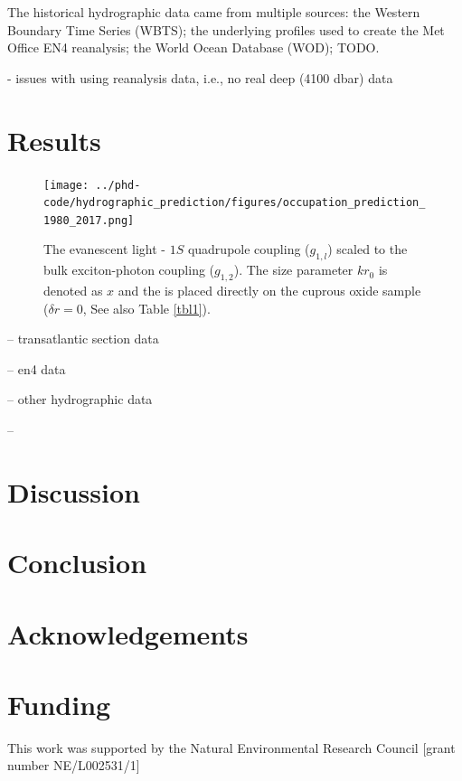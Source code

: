 \documentclass[a4paper,fleqn]{cas-sc}
\begin{document}
The historical hydrographic data came from multiple sources: the Western Boundary Time Series (WBTS); the underlying profiles used to create the Met Office EN4 reanalysis; the World Ocean Database (WOD); TODO.

- issues with using reanalysis data, i.e., no real deep (4100 dbar) data


\section{Results}

\begin{figure}
	\centering
		\texttt{[image: ../phd-code/hydrographic\_prediction/figures/occupation\_prediction\_1980\_2017.png]}
	\caption{The evanescent light - $1S$ quadrupole coupling
	($g_{1,l}$) scaled to the bulk exciton-photon coupling
	($g_{1,2}$). The size parameter $kr_{0}$ is denoted as $x$ and
	the \PMS is placed directly on the cuprous oxide sample ($\delta
	r=0$, See also Table \protect\ref{tbl1}).}
	\label{FIG:1}
\end{figure}

-- transatlantic section data

-- en4 data

-- other hydrographic data

-- 

\section{Discussion}

\section{Conclusion}

\section{Acknowledgements}

\section{Funding}

This work was supported by the Natural Environmental Research Council [grant number NE/L002531/1]
\end{document}
